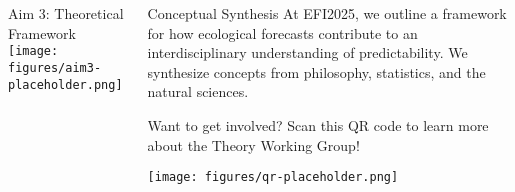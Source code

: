 \documentclass[final]{beamer}
\begin{document}
\begin{frame}[t]
\begin{columns}[t,totalwidth=0.99\textwidth]
\begin{column}{0.32\textwidth}
\begin{block}{Aim 3: Theoretical Framework}
    \vspace{1em}
    \texttt{[image: figures/aim3-placeholder.png]} %
  \end{block}
\end{column}

\begin{column}{0.32\textwidth}
  \begin{exampleblock}{Conceptual Synthesis}
    At EFI2025, we outline a framework for how ecological forecasts contribute to an interdisciplinary understanding of predictability. We synthesize concepts from philosophy, statistics, and the natural sciences.
  \end{exampleblock}

  \begin{alertblock}{Want to get involved?}
    Scan this QR code to learn more about the Theory Working Group!
    
    \vspace{1em}
    \texttt{[image: figures/qr-placeholder.png]} %
  \end{alertblock}
\end{column}

\end{columns}

\end{frame}
\end{document}
